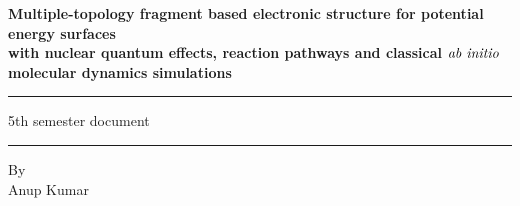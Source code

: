%
%

\thispagestyle{empty}

\begin{center}
\LARGE
{\bf Multiple-topology fragment based electronic structure for potential energy surfaces \\
with nuclear quantum effects, reaction pathways and classical $\it{ab~ initio}$ molecular
dynamics simulations}

\large
\vspace{5mm}
\rule{5in}{0.01in}
\vspace{5mm}

\Large
5th semester document\\

\vspace{5mm}
\rule{5in}{0.01in}
\vspace{5mm}

\Large
By\\
Anup Kumar\\
\date{\today}

\end{center}
